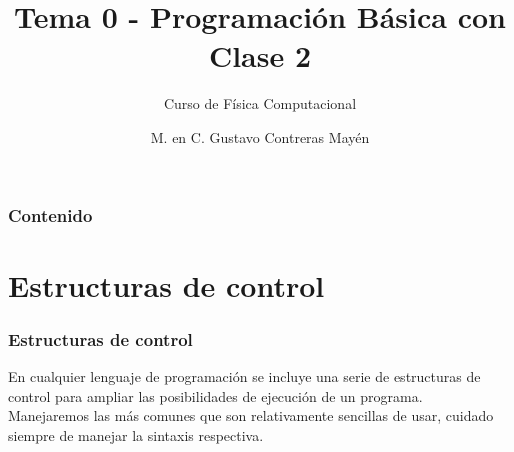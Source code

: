 


\title{Tema 0 - Programación Básica con \python \\ Clase 2}
\subtitle{Curso de Física Computacional}
\author[]{M. en C. Gustavo Contreras Mayén}
\date{ }
\maketitle
\fontsize{14}{14}\selectfont
{}
\begin{frame}
\frametitle{Contenido}
\tableofcontents[pausesections]
\end{frame}
\section{Estructuras de control}
\begin{frame}
\frametitle{Estructuras de control}
En cualquier lenguaje de programación se incluye una serie de estructuras de control para ampliar las posibilidades de ejecución de un programa.
\\
\bigskip
Manejaremos las más comunes que son relativamente sencillas de usar, cuidado siempre de manejar la sintaxis respectiva.
\end{frame}
